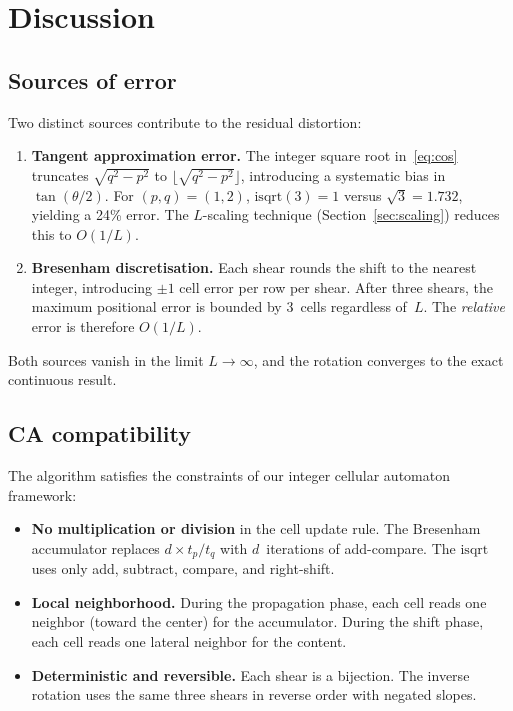 \documentclass[12pt,a4paper]{article}
\begin{document}
\section{Discussion}
\label{sec:discussion}

\subsection{Sources of error}

Two distinct sources contribute to the residual distortion:

\begin{enumerate}
\item \textbf{Tangent approximation error.}
  The integer square root in~\eqref{eq:cos} truncates
  $\sqrt{q^2-p^2}$ to $\lfloor\sqrt{q^2-p^2}\rfloor$, introducing
  a systematic bias in $\tan(\theta/2)$.  For $(p,q)=(1,2)$,
  $\mathrm{isqrt}(3)=1$ versus $\sqrt{3}=1.732$, yielding a 24\%
  error.  The $L$-scaling technique (Section~\ref{sec:scaling})
  reduces this to $O(1/L)$.

\item \textbf{Bresenham discretisation.}
  Each shear rounds the shift to the nearest integer, introducing
  $\pm 1$ cell error per row per shear.  After three shears, the
  maximum positional error is bounded by 3~cells regardless of~$L$.
  The \emph{relative} error is therefore $O(1/L)$.
\end{enumerate}

Both sources vanish in the limit $L\to\infty$, and the rotation
converges to the exact continuous result.

\subsection{CA compatibility}

The algorithm satisfies the constraints of our integer cellular
automaton framework:
\begin{itemize}
\item \textbf{No multiplication or division} in the cell update rule.
  The Bresenham accumulator replaces $d \times t_p / t_q$ with
  $d$~iterations of add-compare.  The $\mathrm{isqrt}$ uses only
  add, subtract, compare, and right-shift.
\item \textbf{Local neighborhood.}
  During the propagation phase, each cell reads one neighbor
  (toward the center) for the accumulator.  During the shift phase,
  each cell reads one lateral neighbor for the content.
\item \textbf{Deterministic and reversible.}
  Each shear is a bijection.  The inverse rotation uses the same
  three shears in reverse order with negated slopes.
\end{itemize}
\end{document}
